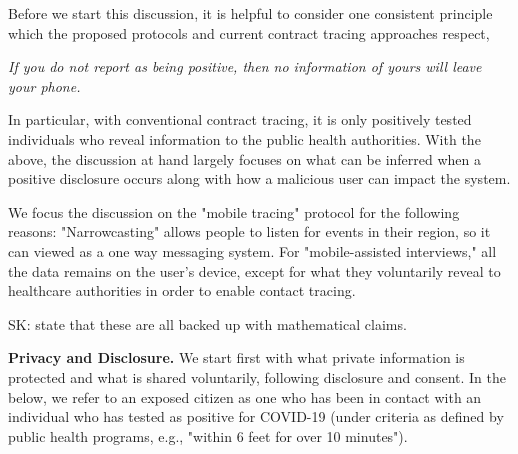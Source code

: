\documentclass{article}
\newcommand{\sk}[1]{\textsf{\color{magenta} SK: #1}}
\begin{document}
Before we start this discussion, it is helpful to consider one consistent principle which the proposed protocols and current contract tracing approaches respect,

\begin{center}
\emph{If you do not report as being positive, then no information of yours will leave your phone.}
\end{center}

In particular, with conventional contract tracing, it is only positively tested individuals who reveal information to the public health authorities. With the above, the discussion at hand largely focuses on what can be inferred when a positive disclosure occurs along with how a malicious user can impact the system.

We focus the discussion on the "mobile tracing" protocol for the following reasons:  "Narrowcasting" allows people to listen for events in their region, so it can viewed as a one way messaging system. For "mobile-assisted interviews," all the data remains on the user's device, except for what they voluntarily reveal to healthcare authorities in order to enable contact tracing.

\sk{state that these are all backed up with mathematical claims.}


\textbf{Privacy and Disclosure.} We start first with what private information is protected and what is shared voluntarily, following disclosure and consent. In the below, we refer to an exposed citizen as one who has been in contact with an individual who has tested as positive for COVID-19 (under criteria as defined by public health programs, e.g., "within 6 feet for over 10 minutes").


\end{document}
